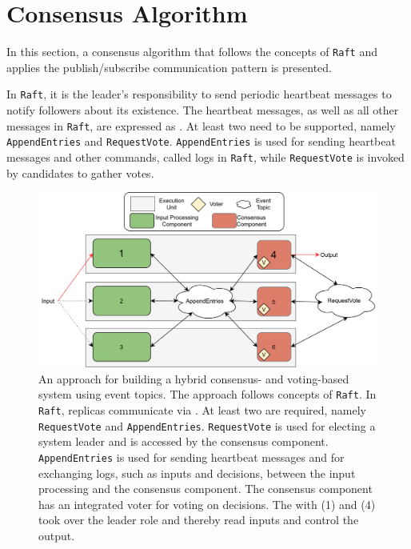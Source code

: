 \section{Consensus Algorithm}
\label{sec:ImpConsensusAlgorithm}

In this section, a consensus algorithm that follows the concepts of \texttt{Raft} and applies the  publish/subscribe communication pattern is presented.

In \texttt{Raft}, it is the leader's responsibility to send periodic heartbeat messages to notify followers about its existence.
The heartbeat messages, as well as all other messages in \texttt{Raft}, are expressed as .
At least two  need to be supported, namely \texttt{AppendEntries} and \texttt{RequestVote}.
\texttt{AppendEntries} is used for sending heartbeat messages and other commands, called logs in \texttt{Raft}, while \texttt{RequestVote} is invoked by candidates to gather votes.

\begin{figure}[!hb]
	\centering
	\includegraphics[width=0.9\linewidth]{images/ThreeEUConsensusDDS}
	\caption{An approach for building a hybrid consensus- and voting-based  system using  event topics. The approach follows concepts of \texttt{Raft}. In \texttt{Raft}, replicas communicate via . At least two  are required, namely \texttt{RequestVote} and \texttt{AppendEntries}. \texttt{RequestVote} is used for electing a system leader and is accessed by the consensus component. \texttt{AppendEntries} is used for sending heartbeat messages and for exchanging logs, such as inputs and decisions, between the input processing and the consensus component. The consensus component has an integrated voter for voting on decisions. The  with (1) and (4) took over the leader role and thereby read inputs and control the output.}
	\label{fig:ThreeRepConsensusDDS}
\end{figure}

